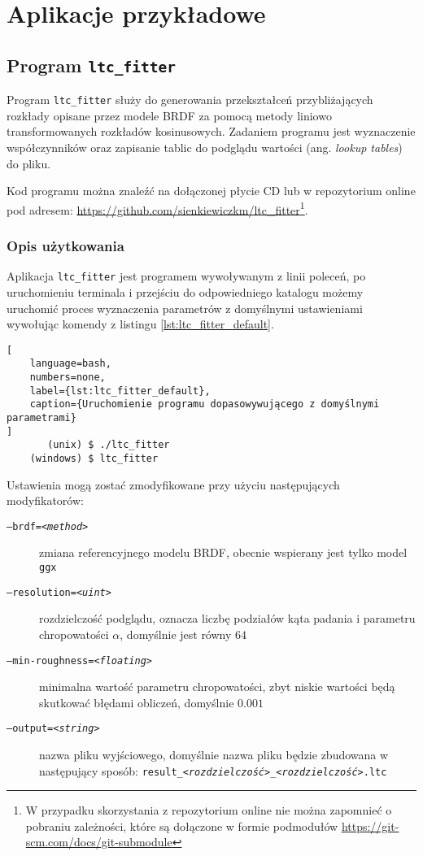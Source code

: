 \documentclass[../main.tex]{subfiles}
\begin{document}
\chapter{Aplikacje przykładowe}

\section{Program \texttt{ltc\_fitter}}

Program \texttt{ltc\_fitter} służy do generowania przekształceń przybliżających rozkłady opisane przez modele BRDF za pomocą metody liniowo transformowanych rozkładów kosinusowych. Zadaniem programu jest wyznaczenie współczynników oraz zapisanie tablic do podglądu wartości (ang. \textit{lookup tables}) do pliku.

Kod programu można znaleźć na dołączonej płycie CD lub w repozytorium online pod adresem: \url{https://github.com/sienkiewiczkm/ltc_fitter}\footnote{W przypadku skorzystania z repozytorium online nie można zapomnieć o pobraniu zależności, które są dołączone w formie podmodułów \url{https://git-scm.com/docs/git-submodule}}.

\subsection{Opis użytkowania}

Aplikacja \texttt{ltc\_fitter} jest programem wywoływanym z linii poleceń, po uruchomieniu terminala i przejściu do odpowiedniego katalogu możemy uruchomić proces wyznaczenia parametrów z domyślnymi ustawieniami wywołując komendy z listingu \ref{lst:ltc_fitter_default}.

\begin{lstlisting}[
    language=bash,
    numbers=none,
    label={lst:ltc_fitter_default},
    caption={Uruchomienie programu dopasowywującego z domyślnymi parametrami}
]
       (unix) $ ./ltc_fitter
    (windows) $ ltc_fitter
\end{lstlisting}

Ustawienia mogą zostać zmodyfikowane przy użyciu następujących modyfikatorów:
\begin{description}
    \item[\texttt{--brdf=\textit{<method>}}] zmiana referencyjnego modelu BRDF, obecnie wspierany jest tylko model \texttt{ggx}
    
    \item[\texttt{--resolution=\textit{<uint>}}] rozdzielczość podglądu, oznacza liczbę podziałów kąta padania i parametru chropowatości $\alpha$, domyślnie jest równy $64$
    
    \item[\texttt{--min-roughness=\textit{<floating>}}] minimalna wartość parametru chropowatości, zbyt niskie wartości będą skutkować błędami obliczeń, domyślnie $0.001$
    
    \item[\texttt{--output=\textit{<string>}}] nazwa pliku wyjściowego, domyślnie nazwa pliku będzie zbudowana w następujący sposób: \texttt{result\_\textit{<rozdzielczość>}\_\textit{<rozdzielczość>}.ltc}
\end{description}
\end{document}
